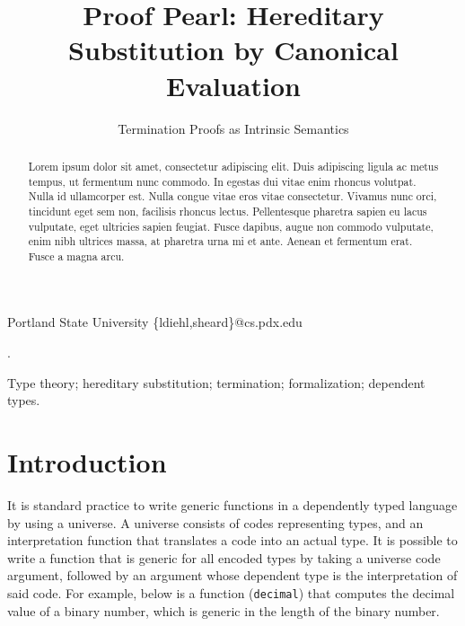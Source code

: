 \documentclass[preprint,nonatbib]{sigplanconf}
\begin{document}
\setlength{\pdfpageheight}{\paperheight}
\setlength{\pdfpagewidth}{\paperwidth}


\title{Proof Pearl: Hereditary Substitution by Canonical Evaluation}
\subtitle{Termination Proofs as Intrinsic Semantics}

           {Portland State University}
           {\{ldiehl,sheard\}@cs.pdx.edu}

\maketitle

\begin{abstract}
Lorem ipsum dolor sit amet, consectetur adipiscing elit. Duis
adipiscing ligula ac metus tempus, ut fermentum nunc commodo. In
egestas dui vitae enim rhoncus volutpat. Nulla id ullamcorper est.
Nulla congue vitae eros vitae consectetur. Vivamus nunc orci,
tincidunt eget sem non, facilisis rhoncus lectus. Pellentesque
pharetra sapien eu lacus vulputate, eget ultricies sapien feugiat.
Fusce dapibus, augue non commodo vulputate, enim nibh ultrices massa,
at pharetra urna mi et ante. Aenean et fermentum erat. Fusce a magna
arcu.
\end{abstract}

.

\keywords
Type theory; hereditary substitution; termination; formalization; dependent types.

\section{Introduction}
\label{sec:intro}

It is standard practice to write generic functions in a dependently
typed language by using a \citet{martin1975intuitionistic} universe.
A universe consists of codes representing types, and an interpretation
function that translates a code into an actual type. It is possible to
write a function that is generic for all encoded types by taking a
universe code argument, followed by an argument whose dependent type
is the interpretation of said code. For example, below is a function
({\tt decimal}) that computes the decimal value of a binary number, which
is generic in the length of the binary number.
\end{document}
